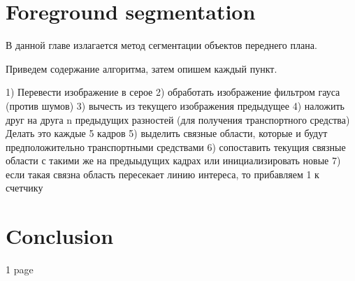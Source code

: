 \documentclass[12pt,a4paper,oneside,titlepage]{article}
\begin{document}
\newpage
\section*{Foreground segmentation}
В данной главе излагается метод сегментации объектов переднего плана.





Приведем содержание алгоритма, затем опишем каждый пункт.

1) Перевести изображение в серое
2) обработать изображение фильтром гауса (против шумов)
3) вычесть из текущего изображения предыдущее
4) наложить друг на друга n предыдущих разностей (для получения транспортного средства) Делать это каждые 5 кадров
5) выделить связные области, которые и будут предположительно транспортными средствами 
6) сопоставить текущия связные области с такими же на предыыдущих кадрах или инициализировать новые
7) если такая связна область пересекает линию интереса, то прибавляем 1 к счетчику



\newpage
\section*{Conclusion}
1 page


\newpage
\renewcommand\refname{Bibliography}


\end{document}
